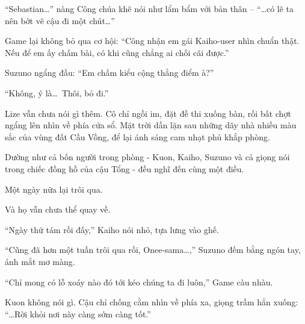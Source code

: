 \documentclass[../main.tex]{subfiles}
\begin{document}
``Sebastian\dots'' nàng Công chúa khẽ nói như lẩm bẩm với bản thân – ``\dots có lẽ ta nên bớt vẽ cậu đi một chút\dots''

Game  lại không bỏ qua cơ hội: ``Công nhận em gái Kaiho-user nhìn chuẩn thật. Nếu để em ấy chấm bài, có khi cũng chẳng ai chối cãi được.''

Suzuno ngẩng đầu: ``Em chấm kiểu cộng thẳng điểm à?''

``Không, ý là\dots\ Thôi, bỏ đi.''

Lize vẫn chưa nói gì thêm. Cô chỉ ngồi im, đặt đề thi xuống bàn, rồi bất chợt ngẩng lên nhìn về phía cửa sổ. Mặt trời dần lặn sau những dãy nhà nhiều màu sắc của vùng đất Cầu Vồng, để lại ánh sáng cam nhạt phủ khắp phòng.

Dường như cả bốn người trong phòng - Kuon, Kaiho, Suzuno và cả giọng nói trong chiếc đồng hồ của cậu Tổng - đều nghĩ đến cùng một điều.

Một ngày nữa lại trôi qua.

Và họ vẫn chưa thể quay về.

``Ngày thứ tám rồi đấy,'' Kaiho nói nhỏ, tựa lưng vào ghế.

``Cũng đã hơn một tuần trôi qua rồi, Onee-sama\dots,'' Suzuno đếm bằng ngón tay, ánh mắt mơ màng.

``Chỉ mong có lỗ xoáy nào đó tới kéo chúng ta đi luôn,'' Game càu nhàu.

Kuon không nói gì. Cậu chỉ chống cằm nhìn về phía xa, giọng trầm hẳn xuống: ``\dots Rời khỏi nơi này càng sớm càng tốt.''
\end{document}
